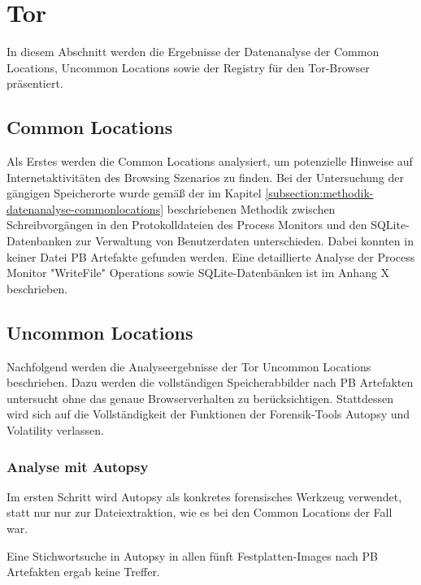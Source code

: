 

\section{Tor}

In diesem Abschnitt werden die Ergebnisse der Datenanalyse der Common Locations, Uncommon Locations sowie der Registry für den Tor-Browser präsentiert.

\subsection*{Common Locations}
Als Erstes werden die Common Locations analysiert, um potenzielle Hinweise auf Internetaktivitäten des Browsing Szenarios zu finden. Bei der Untersuchung der gängigen Speicherorte wurde gemäß der im Kapitel \ref{subsection:methodik-datenanalyse-commonlocations} beschriebenen Methodik zwischen Schreibvorgängen in den Protokolldateien des Process Monitors und den SQLite-Datenbanken zur Verwaltung von Benutzerdaten unterschieden. Dabei konnten in keiner Datei PB Artefakte gefunden werden. Eine detaillierte Analyse der Process Monitor "WriteFile" Operations sowie SQLite-Datenbänken ist im Anhang X beschrieben.

\subsection*{Uncommon Locations}
Nachfolgend werden die Analyseergebnisse der Tor Uncommon Locations beschrieben.
Dazu werden die vollständigen Speicherabbilder nach PB Artefakten untersucht ohne das genaue Browserverhalten zu berücksichtigen. Stattdessen wird sich auf die Vollständigkeit der Funktionen der Forensik-Tools Autopsy und Volatility verlassen.

\subsubsection*{Analyse mit Autopsy}

Im ersten Schritt wird Autopsy als konkretes forensisches Werkzeug verwendet, statt nur nur zur Dateiextraktion, wie es bei den Common Locations der Fall war.

Eine Stichwortsuche in Autopsy in allen fünft Festplatten-Images nach PB Artefakten ergab keine Treffer.

